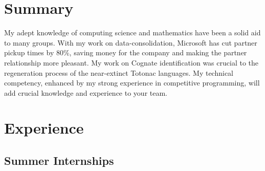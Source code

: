 \documentclass{friggeri-cv} %
\begin{document}
\section{Summary}

My adept knowledge of computing science and mathematics have been a solid aid to many groups. With my work on data-consolidation, Microsoft has cut partner pickup times by 80\%, saving money for the company and making the partner relationship more pleasant. My work on Cognate identification was crucial to the regeneration process of the near-extinct Totonac languages. My technical competency, enhanced by my strong experience in competitive programming, will add crucial knowledge and experience to your team.


\section{Experience}

\subsection{Summer Internships}
\end{document}
